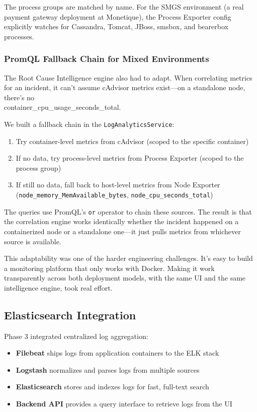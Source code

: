 \documentclass[12pt,a4paper]{report}
\begin{document}
The process groups are matched by name. For the SMGS environment (a real payment gateway deployment at Monetique), the Process Exporter config explicitly watches for Cassandra, Tomcat, JBoss, smsbox, and bearerbox processes.

\subsubsection{PromQL Fallback Chain for Mixed Environments}

The Root Cause Intelligence engine also had to adapt. When correlating metrics for an incident, it can't assume cAdvisor metrics exist---on a standalone node, there's no \texttt \\  {container\_cpu\_usage\_seconds\_total}.

We built a fallback chain in the \texttt{LogAnalyticsService}:
\begin{enumerate}
  \item Try container-level metrics from cAdvisor (scoped to the specific container)
  \item If no data, try process-level metrics from Process Exporter (scoped to the process group)
  \item If still no data, fall back to host-level metrics from Node Exporter \\  (\texttt{node\_memory\_MemAvailable\_bytes}, \texttt{node\_cpu\_seconds\_total})
\end{enumerate}

The queries use PromQL's \texttt{or} operator to chain these sources. The result is that the correlation engine works identically whether the incident happened on a containerized node or a standalone one---it just pulls metrics from whichever source is available.

This adaptability was one of the harder engineering challenges. It's easy to build a monitoring platform that only works with Docker. Making it work transparently across both deployment models, with the same UI and the same intelligence engine, took real effort.

\subsection{Elasticsearch Integration}


Phase 3 integrated centralized log aggregation:

\begin{itemize}
  \item \textbf{Filebeat} ships logs from application containers to the ELK stack
  \item \textbf{Logstash} normalizes and parses logs from multiple sources
  \item \textbf{Elasticsearch} stores and indexes logs for fast, full-text search
  \item \textbf{Backend API} provides a query interface to retrieve logs from the UI
\end{itemize}
\end{document}
